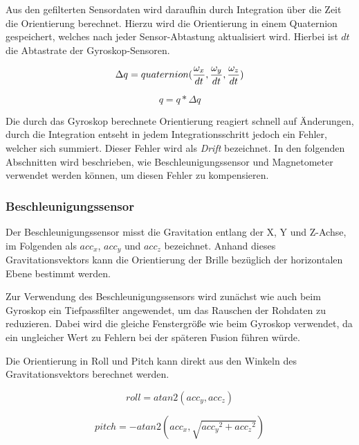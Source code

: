Aus den gefilterten Sensordaten wird daraufhin durch Integration über
die Zeit die Orientierung berechnet. Hierzu wird die Orientierung in einem Quaternion gespeichert, welches nach jeder Sensor-Abtastung aktualisiert wird. Hierbei ist $dt$ die Abtastrate der Gyroskop-Sensoren.

\begin{equation}
    \Delta q = quaternion({\omega_x \over dt}, {\omega_y \over dt}, {\omega_z \over dt}) \\
\end{equation}

\begin{equation}
    q = q * \Delta q
\end{equation}

Die durch das Gyroskop berechnete Orientierung reagiert schnell auf
Änderungen, durch die Integration entseht in jedem Integrationsschritt jedoch ein Fehler, welcher sich summiert. Dieser Fehler wird als \emph{Drift} bezeichnet. In den folgenden Abschnitten wird beschrieben, wie Beschleunigungssensor und Magnetometer verwendet werden können, um diesen Fehler zu kompensieren.


\subsubsection{Beschleunigungssensor}

Der Beschleunigungssensor misst die Gravitation entlang der X, Y und Z-Achse, im Folgenden als $acc_x$, $acc_y$ und $acc_z$ bezeichnet. Anhand dieses Gravitationsvektors kann die Orientierung der Brille bezüglich der horizontalen Ebene bestimmt werden.

Zur Verwendung des Beschleunigungssensors wird zunächst wie auch beim
Gyroskop ein Tiefpassfilter angewendet, um das Rauschen der Rohdaten zu
reduzieren. Dabei wird die gleiche Fenstergröße wie beim Gyroskop
verwendet, da ein ungleicher Wert zu Fehlern bei der späteren Fusion
führen würde. 


Die Orientierung in Roll und Pitch kann direkt aus den Winkeln des Gravitationsvektors berechnet werden.

\begin{equation}
    roll = atan2(acc_y, acc_z)
\end{equation}

\begin{equation}
    pitch = -atan2(acc_x, \sqrt{ {acc_y}^2 + {acc_z}^2 })
\end{equation}

